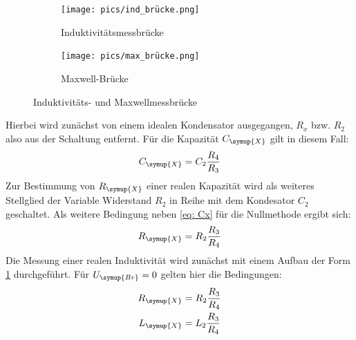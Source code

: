 \begin{figure}
\centering
\begin{subfigure}{0.49\textwidth}
\centering
  \texttt{[image: pics/ind\_brücke.png]}
\caption{Induktivitätsmessbrücke}
\label{fig: induktivität}
\end{subfigure}
\begin{subfigure}{0.49\textwidth}
  \centering
  \texttt{[image: pics/max\_brücke.png]}
  \caption{Maxwell-Brücke}
  \label{fig: maxwell}
\end{subfigure}
\caption{Induktivitäts- und Maxwellmessbrücke\cite{anleitung302}}
\label{fig: indmax}
\end{figure}

Hierbei wird zunächst von einem idealen Kondensator ausgegangen, $R_x$ bzw. $R_2$ also aus der Schaltung entfernt. Für die
Kapazität $C_{\symup{X}}$ gilt in diesem Fall:
\begin{equation}
  C_{\symup{X}} = C_2 \frac{R_4}{R_3}
  \label{eq: Cx}
\end{equation}
Zur Bestimmung von $R_{\symup{X}}$ einer realen Kapazität wird als weiteres Stellglied der Variable Widerstand $R_2$ in Reihe mit dem Kondesator $C_2$
geschaltet. Als weitere Bedingung neben \eqref{eq: Cx} für die Nullmethode ergibt sich:
\begin{equation}
  R_{\symup{X}} = R_2\frac{R_3}{R_4}
  \label{eq: Rx}
\end{equation}
Die Messung einer realen Induktivität wird zunächst mit einem Aufbau der Form \ref{fig: induktivität} durchgeführt.
Für $U_{\symup{Br}} = 0$ gelten hier die Bedingungen:
\begin{align}
  \begin{aligned}
    R_{\symup{X}} &= R_2\frac{R_3}{R_4} \\
    L_{\symup{X}} &= L_2\frac{R_3}{R_4}
  \end{aligned}
  \label{eq: Lx}
\end{align}

